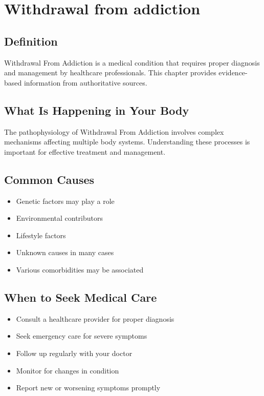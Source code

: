 
\chapter{Withdrawal from addiction}

\section*{Definition}
Withdrawal From Addiction is a medical condition that requires proper diagnosis and management by healthcare professionals. This chapter provides evidence-based information from authoritative sources.

\section*{What Is Happening in Your Body}
The pathophysiology of Withdrawal From Addiction involves complex mechanisms affecting multiple body systems. Understanding these processes is important for effective treatment and management.

\section*{Common Causes}
\begin{itemize}
  \item Genetic factors may play a role
  \item Environmental contributors
  \item Lifestyle factors
  \item Unknown causes in many cases
  \item Various comorbidities may be associated
\end{itemize}

\section*{When to Seek Medical Care}
\begin{itemize}
  \item Consult a healthcare provider for proper diagnosis
  \item Seek emergency care for severe symptoms
  \item Follow up regularly with your doctor
  \item Monitor for changes in condition
  \item Report new or worsening symptoms promptly
\end{itemize}

